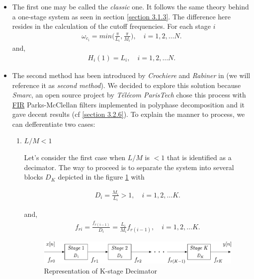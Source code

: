 \begin{itemize}
	\item The first one may be called the \textit{classic} one. It follows the same theory behind a one-stage system as seen in section \ref{section 3.1.3}. The difference here resides in the calculation of the cutoff frequencies. For each stage $i$
	\begin{align}
		\omega_{c_i} = min\Big(\frac{\pi}{L_i},\frac{\pi}{M_i}\Big), \quad i = 1,2,\dots N. \label{eqn:3.26}
	\end{align}
	and,
	\begin{align}
		H_i(1) = L_i, \quad i = 1,2,\dots N. \label{eqn:3.27}
	\end{align}
	 	
	 \item The second method has been introduced by \textit{Crochiere} and \textit{Rabiner} in \cite{crochiere} (we will reference it as \textit{second method}). We decided to explore this solution because \textit{Smarc}, an open source project by \textit{Télécom ParisTech} \cite{paristech} chose this process with \hyperlink{FIR}{FIR} Parks-McClellan filters implemented in polyphase decomposition and it gave decent results (cf \ref{section 3.2.6}). To explain the manner to process, we can defferentiate two cases:
	 
	 \begin{enumerate}
	 	\item $L/M < 1$
	 	
	 	Let's consider the first case when $L/M$ is $<1$ that is identified as a decimator. The way to proceed is to separate the system into several blocks $D_K$ depicted in the figure \ref{Figure 3.13} with 
	 	
	 	\begin{align}
	 		D_i = \frac{M_i}{L_i} > 1, \quad i = 1,2,\dots K.\label{eqn:3.28}
	 	\end{align} 
	 	
	 	and,
	 	\begin{align}
	 		f_{ri} = \frac{f_{r(i-1)}}{D_i} = \frac{L_i}{M_i}f_{r(i-1)}, \quad i = 1,2,\dots K.
	 	\end{align}
	 	
	 	\begin{figure}[ht!]
	 		\centering
	 		\hspace*{10mm}
	 		\includegraphics[scale = 0.68]{multistage_sup1_1.pdf}
	 		\caption{Representation of K-stage Decimator}\label{Figure 3.13}
	 	\end{figure}
 	

\end{enumerate}
\end{itemize}
